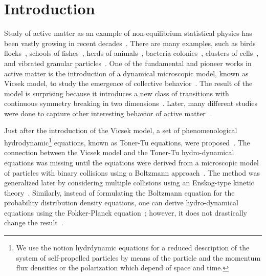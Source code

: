 \documentclass[reprint,floatfix,amsmath,amssymb,aps,pre,showkeys,showpacs,superscriptaddress]{revtex4-1}
\newcommand{\hl}[1]{\textcolor{hlcolor}{#1}}
\begin{document}
\section{Introduction}

Study of active matter as an example of non-equilibrium statistical physics has been vastly growing in recent decades~\cite{marchetti,Vicsek2012,Redner2013structure,cates2014,caussin2014,Weber2015random,Solon2015,Ginot2015nonequilibrium,Battle2016broken,Menzel2016on}. There are many examples, such as birds flocks~\cite{Biro2006,Nagy2010,Attanasi2014information,Cavagna2015silent,Cavagna2015flocking}, schools of fishes~\cite{Makris2006,Becco2006,Lopez2012from}, herds of animals~\cite{ginelli2015,toulet2015}, bacteria colonies~\cite{Dombrowski2004self,Sokolov2007concentration,peruani2012}, clusters of cells~\cite{Segerer2015emergence}, and vibrated granular particles~\cite{Narayan2007,kumar2014flocking}. One of the  fundamental and pioneer works in active matter is the introduction of a dynamical microscopic model, known as Vicsek model, to study the emergence of collective behavior~\cite{Vicsek1995}. The result of the model is surprising because it introduces a new class of transitions with continuous symmetry breaking in two dimensions~\cite{chepizhko2013,weitz2015}. Later, many different studies were done to capture other interesting behavior of active matter~\cite{Vicsek1995,Shimoyama1996,Czirok1997,Chate2008a, Peruani2011polar,Farrell2012,solon2013,Weber2014defect,Fily2015dynamics,Bratanov2015new,Chepizhko2015active,nagia2015collective,Grossmann2016superdiffusion,denk2016active}.




Just after the introduction of \hl{the} Vicsek model, a set of phenomenological hydrodynamic\hl{\footnote{We use the notion hydrdynamic equations for a reduced description of the system of self-propelled particles by means of the particle and the momentum flux densities or  the polarization which depend of space and time.}} equations,  known as \hl{Toner}-Tu equations, were proposed~\cite{Toner1995}. The connection between the Vicsek model and the \hl{Toner}-Tu hydro-dynamical equations was missing until the equations were derived from a microscopic model of particles with binary collisions using \hl{a} Boltzmann approach~\cite{Bertin2006,Bertin2009,Peshkov2012,Peshkov2012continuous}. The method was generalized later by considering multiple collisions using \hl{an} Enskog-type kinetic theory~\cite{ihle2011kinetic,Chou2012kinetic,Ihle2014toward,Ihle2015large}. Similarly, instead of \hl{formulating the Boltzmann equation for the probability distribution density} equations, one can derive hydro-dynamical equations using the \hl{Fokker-Planck} equation~\cite{Baskaran2008,Farrell2012,Grossmann2013}; however, it does not drastically change the result~\cite{Bertin2015}.
\end{document}
